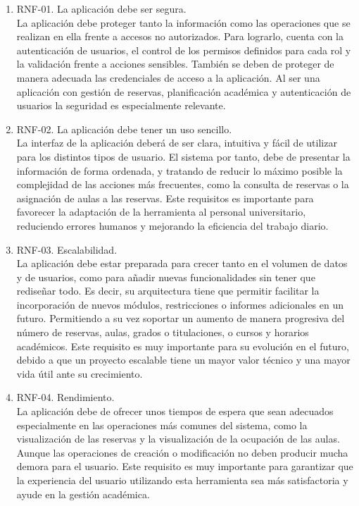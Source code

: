 \begin{enumerate}
	\item RNF-01. La aplicación debe ser segura.
	\\La aplicación debe proteger tanto la información como las operaciones que se realizan en ella frente a accesos no autorizados. Para lograrlo, cuenta con la autenticación de usuarios, el control de los permisos definidos para cada rol y la validación frente a acciones sensibles. También se deben de proteger de manera adecuada las credenciales de acceso a la aplicación. Al ser una aplicación con gestión de reservas, planificación académica y autenticación de usuarios la seguridad es especialmente relevante.
	\item RNF-02. La aplicación debe tener un uso sencillo.
	\\La interfaz de la aplicación deberá de ser clara, intuitiva y fácil de utilizar para los distintos tipos de usuario. El sistema por tanto, debe de presentar la información de forma ordenada, y tratando de reducir lo máximo posible la complejidad de las acciones más frecuentes, como la consulta de reservas o la asignación de aulas a las reservas. Este requisitos es importante para favorecer la adaptación de la herramienta al personal universitario, reduciendo errores humanos y mejorando la eficiencia del trabajo diario.
	\item RNF-03. Escalabilidad.
	\\La aplicación debe estar preparada para crecer tanto en el volumen de datos y de usuarios, como para añadir nuevas funcionalidades sin tener que rediseñar todo. Es decir, su arquitectura tiene que permitir facilitar la incorporación de nuevos módulos, restricciones o informes adicionales en un futuro. Permitiendo a su vez soportar un aumento de manera progresiva del número de reservas, aulas, grados o titulaciones, o cursos y horarios académicos. Este requisito es muy importante para su evolución en el futuro, debido a que un proyecto escalable tiene un mayor valor técnico y una mayor vida útil ante su crecimiento.
	\item RNF-04. Rendimiento.
	\\La aplicación debe de ofrecer unos tiempos de espera que sean adecuados especialmente en las operaciones más comunes del sistema, como la visualización de las reservas y la visualización de la ocupación de las aulas. Aunque las operaciones de creación o modificación no deben producir mucha demora para el usuario. Este requisito es muy importante para garantizar que la experiencia del usuario utilizando esta herramienta sea más satisfactoria y ayude en la gestión académica.

\end{enumerate}
